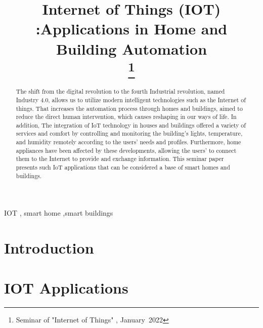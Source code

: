 \documentclass[conference]{IEEEtran}
\begin{document}
\title{Internet of Things (IOT) :Applications in  Home and Building Automation 
	\\

\thanks{Seminar of  "Internet of  Things" , January~2022}
}

\author{

}

\maketitle

\begin{abstract}
	
The shift from the digital revolution to the fourth Industrial revolution, named Industry 4.0, allows us to utilize modern intelligent technologies such as the Internet of things. That increases the automation process through homes and buildings, aimed to reduce the direct human intervention, which causes reshaping in our ways of life. In addition, The integration of  IoT technology in houses and buildings offered a variety of services and comfort by controlling and monitoring the building's lights, temperature, and humidity remotely according to the users' needs and profiles. Furthermore, home appliances have been affected by these developments, allowing the users' to connect them to the Internet to provide and exchange information. This seminar paper presents such IoT applications that can be considered a base of smart homes and buildings. 



\end{abstract}

\begin{IEEEkeywords}
IOT , smart home ,smart buildings 
\end{IEEEkeywords}

\section{Introduction}


\section{IOT Applications }
\end{document}

